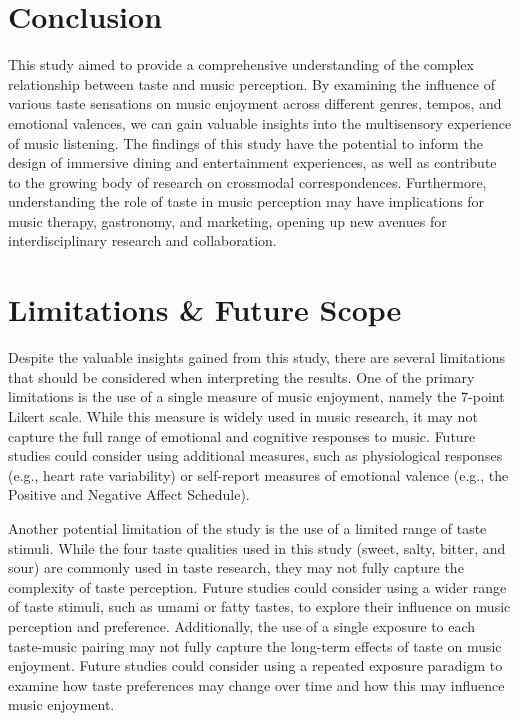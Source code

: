 \documentclass[conference]{IEEEtran}
\begin{document}
\section{Conclusion}
This study aimed to provide a comprehensive understanding of the complex relationship between taste and music perception. By examining the influence of various taste sensations on music enjoyment across different genres, tempos, and emotional valences, we can gain valuable insights into the multisensory experience of music listening. The findings of this study have the potential to inform the design of immersive dining and entertainment experiences, as well as contribute to the growing body of research on crossmodal correspondences. Furthermore, understanding the role of taste in music perception may have implications for music therapy, gastronomy, and marketing, opening up new avenues for interdisciplinary research and collaboration.

\section{Limitations \& Future Scope}

Despite the valuable insights gained from this study, there are several limitations that should be considered when interpreting the results. One of the primary limitations is the use of a single measure of music enjoyment, namely the 7-point Likert scale. While this measure is widely used in music research, it may not capture the full range of emotional and cognitive responses to music. Future studies could consider using additional measures, such as physiological responses (e.g., heart rate variability) or self-report measures of emotional valence (e.g., the Positive and Negative Affect Schedule).

Another potential limitation of the study is the use of a limited range of taste stimuli. While the four taste qualities used in this study (sweet, salty, bitter, and sour) are commonly used in taste research, they may not fully capture the complexity of taste perception. Future studies could consider using a wider range of taste stimuli, such as umami or fatty tastes, to explore their influence on music perception and preference.
Additionally, the use of a single exposure to each taste-music pairing may not fully capture the long-term effects of taste on music enjoyment. Future studies could consider using a repeated exposure paradigm to examine how taste preferences may change over time and how this may influence music enjoyment.
\end{document}

